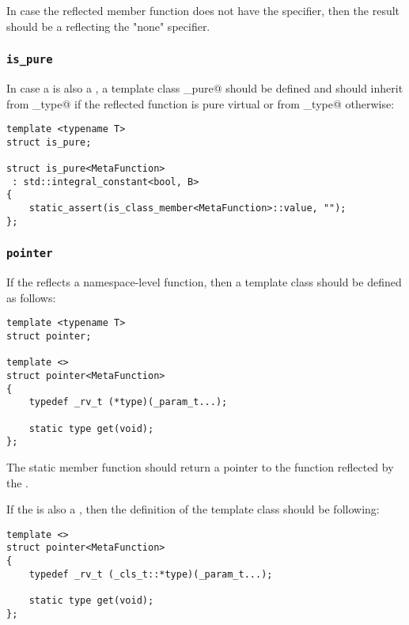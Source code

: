 In case the reflected member function does not have the \verb@virtual@ specifier,
then the result should be a  reflecting the "none" specifier.

\subsubsection{\texttt{is\_pure}}

In case a  is also a ,
a template class \verb@is_pure@ should be defined and should inherit from
\verb@true_type@ if the reflected function is pure virtual or from \verb@false_type@
otherwise:

\begin{verbatim}
template <typename T>
struct is_pure;

struct is_pure<MetaFunction>
 : std::integral_constant<bool, B>
{
	static_assert(is_class_member<MetaFunction>::value, "");
};
\end{verbatim}

\subsubsection{\texttt{pointer}}

If the  reflects a namespace-level function, then
a template class \verb@pointer@ should be defined as follows:

\begin{verbatim}
template <typename T>
struct pointer;

template <>
struct pointer<MetaFunction>
{
	typedef _rv_t (*type)(_param_t...);

	static type get(void);
};
\end{verbatim}

The \verb@get@ static member function should return a pointer to the function
reflected by the .

If the  is also a , then the definition of the
\verb@pointer@ template class should be following:

\begin{verbatim}
template <>
struct pointer<MetaFunction>
{
	typedef _rv_t (_cls_t::*type)(_param_t...);

	static type get(void);
};
\end{verbatim}

